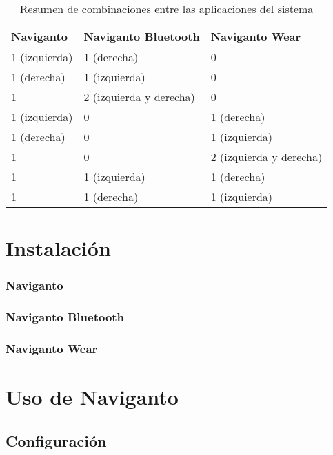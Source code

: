 \begin{table}[h]
  \centering
  \begin{tabular}{|l|l|l|}
    \hline
    \textbf{Naviganto} & \textbf{Naviganto Bluetooth} & \textbf{Naviganto Wear} \\
    \hline
    1 (izquierda) & 1 (derecha)             & 0                       \\
    \hline
    1 (derecha)   & 1 (izquierda)           & 0                       \\
    \hline
    1             & 2 (izquierda y derecha) & 0                       \\
    \hline
    1 (izquierda) & 0                       & 1 (derecha)             \\
    \hline
    1 (derecha)   & 0                       & 1 (izquierda)           \\
    \hline
    1             & 0                       & 2 (izquierda y derecha) \\
    \hline
    1             & 1 (izquierda)           & 1 (derecha)             \\
    \hline
    1             & 1 (derecha)             & 1 (izquierda)           \\
    \hline
  \end{tabular}
  \caption{Resumen de combinaciones entre las aplicaciones del sistema}
  \label{cuadro:convinacionesApps}
\end{table}


\section{Instalación}
\subsubsection{Naviganto}
\subsubsection{Naviganto Bluetooth}
\subsubsection{Naviganto Wear}

\section{Uso de Naviganto}
\subsection{Configuración}
